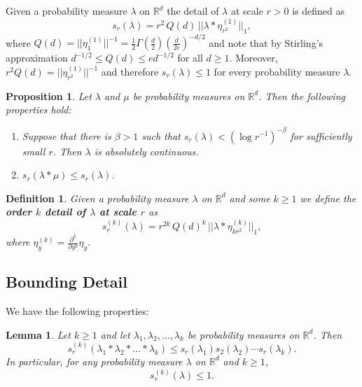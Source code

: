 \documentclass[10pt, english,oneside,reqno]{amsart}
\theoremstyle{plain}
\newtheorem{definition}[theorem]{Definition}
\newtheorem{proposition}[theorem]{Proposition}
\newtheorem{lemma}[theorem]{Lemma}
\theoremstyle{remark}
\numberwithin{equation}{section}
\numberwithin{figure}{section}
\newcommand{\R}{\mathbb{R}}
\begin{document}
Given a probability measure $\lambda$ on $\R^d$ the detail of $\lambda$ at scale $r > 0$ is defined as $$s_r(\lambda) = r^2 \, Q(d) \, ||\lambda * \eta_{r^2}^{(1)}||_1,$$ where $Q(d) = ||\eta_1^{(1)}||^{-1} = \frac{1}{2}\Gamma(\frac{d}{2})(\frac{d}{2e})^{-d/2}$ and note that by Stirling's approximation $d^{-1/2} \leq Q(d) \leq e d^{-1/2}$ for all $d\geq 1$. Moreover, $r^2  Q(d) = ||\eta_{r^2}^{(1)}||^{-1}$ and therefore $s_r(\lambda) \leq 1$ for every probability measure $\lambda$.


\begin{proposition}\cite[section 2]{Kittle2021}\label{DetailBasic}
    Let $\lambda$ and $\mu$ be probability measures on $\R^d$. Then the following properties hold:
    \begin{enumerate}[label = (\roman*)]
        \item Suppose that there is $\beta > 1$ such that $s_r(\lambda) < (\log r^{-1})^{-\beta}$ for sufficiently small $r$. Then $\lambda$ is absolutely continuous. 
        \item $s_r(\lambda * \mu) \leq s_r(\lambda).$
    \end{enumerate}
\end{proposition}


\begin{definition}
    Given a probability measure $\lambda$ on $\R^d$ and some $k \geq 1$ we define the \textbf{order $k$ detail of $\lambda$ at scale $r$} as $$s_r^{(k)}(\lambda) = r^{2k} \, Q(d)^k \, ||  \lambda *   \eta_{kr^2}^{(k)}  ||_1,$$ where $\eta_y^{(k)} = \frac{\partial^k}{\partial y^k}\eta_y$. 
\end{definition}

\subsection{Bounding Detail}

We have the following properties:

\begin{lemma}\label{BasicProductBound}
    Let $k \geq 1$ and let $\lambda_1, \lambda_2, \ldots , \lambda_k$ be probability measures on $\R^d$. Then  
    \begin{equation}\label{kDetailtoDetailBound}
        s_r^{(k)}(\lambda_1 * \lambda_2 * \ldots * \lambda_k) \leq s_r(\lambda_1) s_2(\lambda_2)\cdots s_r(\lambda_k).
    \end{equation}
    In particular, for any probability measure $\lambda$ on $\R^d$ and $k\geq 1$,
    \begin{equation}\label{kDetailBasic}
        s_r^{(k)}(\lambda) \leq 1.
    \end{equation}
\end{lemma}
\end{document}
